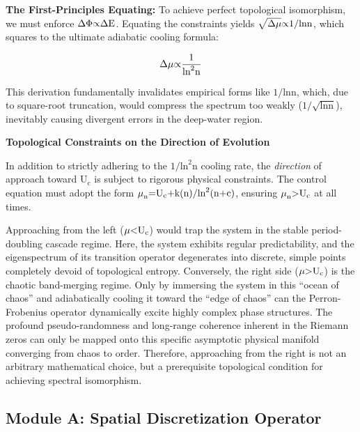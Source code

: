 \documentclass[fleqn,10pt]{wlscirep}
\begin{document}
\textbf{The First-Principles Equating:} To achieve perfect topological
isomorphism, we must enforce \(\text{\ensuremath{\Delta}\ensuremath{\Phi}\ensuremath{\propto}\ensuremath{\Delta}}\text{E}\). Equating the
constraints yields \(\sqrt{\text{\ensuremath{\Delta}}\text{\ensuremath{\mu}}}\text{\ensuremath{\propto}1/ln}\text{n}\),
which squares to the ultimate adiabatic cooling formula:

\[\text{\ensuremath{\Delta}}\text{\ensuremath{\mu}}\text{\ensuremath{\propto}}\frac{\text{1}}{\text{ln}^{\text{2}}\text{n}}\]

This derivation fundamentally invalidates empirical forms like
\(\text{1/ln}\text{n}\), which, due to square-root truncation, would
compress the spectrum too weakly
(\(\text{1/}\sqrt{\text{ln}\text{n}}\)), inevitably causing divergent
errors in the deep-water region.

\textbf{Topological Constraints on the Direction of Evolution}

In addition to strictly adhering to the
\(\text{1/}\text{ln}^{\text{2}}\text{n}\) cooling rate, the
\emph{direction} of approach toward \(\text{U}_{\text{c}}\) is subject
to rigorous physical constraints. The control equation must adopt the
form
\(\text{\ensuremath{\mu}}_{\text{n}}\text{=}\text{U}_{\text{c}}\text{+}\text{k}\text{(}\text{n}\text{)/}\text{ln}^{\text{2}}\text{(}\text{n}\text{+}\text{c}\text{)}\),
ensuring \(\text{\ensuremath{\mu}}_{\text{n}}\text{>}\text{U}_{\text{c}}\) at all
times.

Approaching from the left (\(\text{\ensuremath{\mu}}\text{<}\text{U}_{\text{c}}\))
would trap the system in the stable period-doubling cascade regime.
Here, the system exhibits regular predictability, and the eigenspectrum
of its transition operator degenerates into discrete, simple points
completely devoid of topological entropy. Conversely, the right side
(\(\text{\ensuremath{\mu}}\text{>}\text{U}_{\text{c}}\)) is the chaotic band-merging
regime. Only by immersing the system in this ``ocean of chaos'' and
adiabatically cooling it toward the ``edge of chaos'' can the
Perron-Frobenius operator dynamically excite highly complex phase
structures. The profound pseudo-randomness and long-range coherence
inherent in the Riemann zeros can only be mapped onto this specific
asymptotic physical manifold converging from chaos to order. Therefore,
approaching from the right is not an arbitrary mathematical choice, but
a prerequisite topological condition for achieving spectral isomorphism.

\subsection*{Module A: Spatial Discretization Operator}
\end{document}
